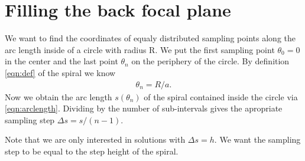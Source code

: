 \documentclass[twocolumn,DIV18]{scrartcl}
\renewcommand{\(}{\left(}
\renewcommand{\)}{\right)}
\begin{document}
\section{Filling the back focal plane}
We want to find the coordinates of equaly distributed sampling points
along the arc length inside of a circle with radius R. We put the
first sampling point $\theta_0=0$ in the center and the last point
$\theta_n$ on the periphery of the circle. By definition
\eqref{eqn:def} of the spiral we know
\begin{align}
  \theta_n=R/a.
\end{align}
Now we obtain the arc length $s(\theta_n)$ of the spiral contained
inside the circle via \eqref{eqn:arclength}. Dividing by the number of
sub-intervals gives the apropriate sampling step $\Delta s=s/(n-1)$.

Note that we are only interested in solutions with $\Delta s=h$. We
want the sampling step to be equal to the step height of the spiral.
\end{document}
